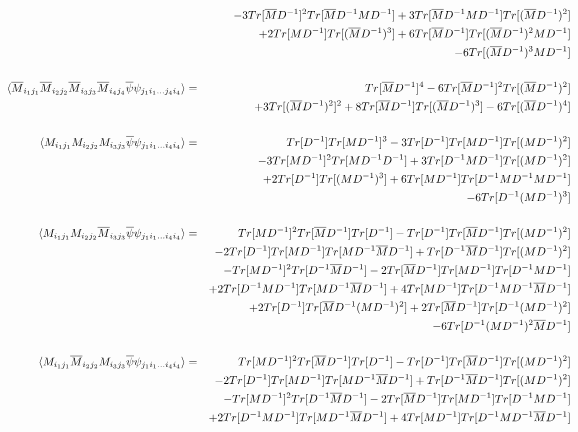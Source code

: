 \documentclass[a4paper,10pt]{report}
\newcommand{\ol}[1]{\overline{#1}}
\newcommand{\Mb}{\ol{M}}
\newcommand{\mv}[1]{\langle #1 \rangle}
\newcommand{\ppb}{\ol{\psi}\psi}
\newcommand{\D}{D^{-1}}
\begin{document}
\begin{eqnarray}
&& - 3 Tr[\Mb\D]^2Tr[\Mb\D M\D] + 3 Tr[\Mb\D M\D]Tr[(\Mb\D)^2] \nonumber\\
&&+ 2 Tr[M\D]Tr[(\Mb\D)^3]+ 6 Tr[\Mb\D]Tr[(\Mb\D)^2M\D]\nonumber\\
&&  - 6 Tr[(\Mb\D)^3M\D]\nonumber\\
\nonumber\\
\hspace*{-19mm}\mv{\Mb_{i_1j_1}\Mb_{i_2j_2}\Mb_{i_3j_3}\Mb_{i_4j_4} \ppb_{j_1i_1...j_4i_4}} &=& 
Tr[\Mb\D]^4 - 6 Tr[\Mb\D]^2Tr[(\Mb\D)^2]  \nonumber\\
&& + 3 Tr[(\Mb\D)^2]^2 + 8 Tr[\Mb\D]Tr[(\Mb\D)^3] - 6 Tr[(\Mb\D)^4]\nonumber\\
%
\nonumber\\
\hspace*{-19mm}\mv{M_{i_1j_1}M_{i_2j_2}M_{i_3j_3} \ppb_{j_1i_1...i_4i_4}} &=&
Tr[\D]Tr[M\D]^3 - 3 Tr[\D]Tr[M\D]Tr[(M\D)^2] \nonumber\\
&& - 3 Tr[M\D]^2Tr[M\D\D] + 3 Tr[\D M\D]Tr[(M\D)^2] \nonumber\\
&& + 2 Tr[\D]Tr[(M\D)^3] + 6 Tr[M\D]Tr[\D M\D M\D] \nonumber\\
&& - 6 Tr[\D(M\D)^3]\nonumber\\
\nonumber\\
\hspace*{-19mm}\mv{M_{i_1j_1}M_{i_2j_2}\Mb_{i_3j_3} \ppb_{j_1i_1...i_4i_4}} &=&
Tr[M\D]^2Tr[\Mb\D]Tr[\D] - Tr[\D]Tr[\Mb\D]Tr[(M\D)^2]\nonumber\\
&& - 2 Tr[\D]Tr[M\D]Tr[M\D \Mb\D]  + Tr[\D\Mb\D]Tr[(M\D)^2]\nonumber\\
&& - Tr[M\D]^2Tr[\D \Mb\D] - 2 Tr[\Mb\D]Tr[M\D]Tr[\D M\D]\nonumber\\
&& + 2 Tr[\D M \D] Tr[M\D \Mb \D] +  4 Tr[M\D] Tr[\D M\D\Mb\D] \nonumber\\
&& + 2 Tr[\D]Tr[\Mb\D(M\D)^2] + 2 Tr[\Mb\D]Tr[\D(M\D)^2]\nonumber\\
&& - 6 Tr[\D(M\D)^2\Mb\D]\nonumber\\
\nonumber\\
\hspace*{-19mm}\mv{M_{i_1j_1}\Mb_{i_2j_2}M_{i_3j_3} \ppb_{j_1i_1...i_4i_4}} &=&
Tr[M\D]^2Tr[\Mb\D]Tr[\D] - Tr[\D]Tr[\Mb\D]Tr[(M\D)^2]\nonumber\\
&& - 2 Tr[\D]Tr[M\D]Tr[M\D \Mb\D]  + Tr[\D\Mb\D]Tr[(M\D)^2]\nonumber\\
&& - Tr[M\D]^2Tr[\D \Mb\D] - 2 Tr[\Mb\D]Tr[M\D]Tr[\D M\D]\nonumber\\
&& + 2 Tr[\D M \D] Tr[M\D \Mb \D] +  4 Tr[M\D] Tr[\D M\D\Mb\D] \nonumber\\

\end{eqnarray}
\end{document}
